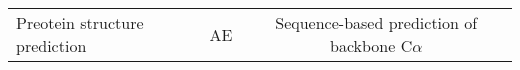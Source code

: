 \begin{center}
\begin{tabular}{l c c}
    Preotein structure prediction & AE & Sequence-based prediction of backbone C$\alpha$ 
\end{tabular}
\end{center}